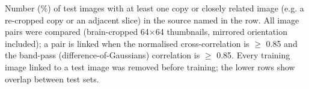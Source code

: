 Number (\%) of test images with at least one copy or closely related image (e.g. a re-cropped copy or an adjacent slice) in the source named in the row. All image pairs were compared (brain-cropped 64$\times$64 thumbnails, mirrored orientation included); a pair is linked when the normalised cross-correlation is $\ge$ 0.85 and the band-pass (difference-of-Gaussians) correlation is $\ge$ 0.85. Every training image linked to a test image was removed before training; the lower rows show overlap between test sets.
